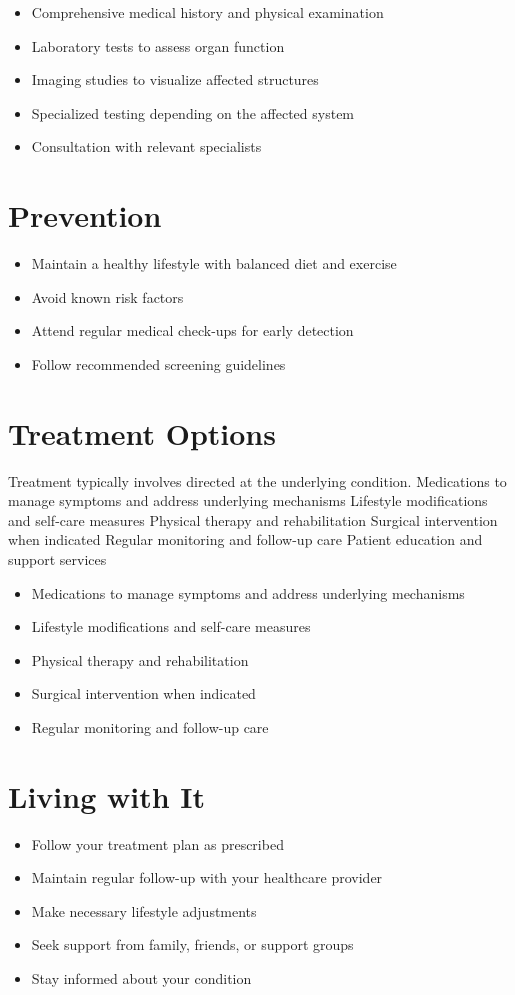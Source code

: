 \begin{itemize}[noitemsep]
  \item Comprehensive medical history and physical examination
  \item Laboratory tests to assess organ function
  \item Imaging studies to visualize affected structures
  \item Specialized testing depending on the affected system
  \item Consultation with relevant specialists
\end{itemize}
\section{Prevention}
\begin{itemize}[noitemsep]
  \item Maintain a healthy lifestyle with balanced diet and exercise
  \item Avoid known risk factors
  \item Attend regular medical check-ups for early detection
  \item Follow recommended screening guidelines
\end{itemize}
\section{Treatment Options}
Treatment typically involves directed at the underlying condition. Medications to manage symptoms and address underlying mechanisms Lifestyle modifications and self-care measures Physical therapy and rehabilitation Surgical intervention when indicated Regular monitoring and follow-up care Patient education and support services

\begin{itemize}[noitemsep]
  \item Medications to manage symptoms and address underlying mechanisms
  \item Lifestyle modifications and self-care measures
  \item Physical therapy and rehabilitation
  \item Surgical intervention when indicated
  \item Regular monitoring and follow-up care
\end{itemize}
\section{Living with It}
\begin{itemize}[noitemsep]
  \item Follow your treatment plan as prescribed
  \item Maintain regular follow-up with your healthcare provider
  \item Make necessary lifestyle adjustments
  \item Seek support from family, friends, or support groups
  \item Stay informed about your condition
\end{itemize}
